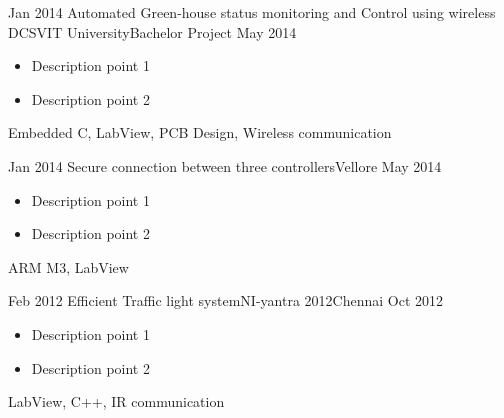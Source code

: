 \begin{experiences}
	\experience
	{Jan 2014}   {Automated Green-house status monitoring and Control using wireless DCS}{VIT University}{Bachelor Project}
	{May 2014} {
	  	\begin{itemize}
	  		\item Description point 1
	  		\item Description point 2
	  	\end{itemize}
	}
	{Embedded C, LabView, PCB Design, Wireless communication }
	\emptySeparator

	\experience
	{Jan 2014}   {Secure connection between three controllers}{}{Vellore}
	{May 2014} {
		\begin{itemize}
			\item Description point 1
			\item Description point 2
		\end{itemize}
	}
	{ARM M3, LabView }
	\emptySeparator
	
	\experience
	{Feb 2012}   {Efficient Traffic light system}{NI-yantra 2012}{Chennai}
	{Oct 2012} {
		\begin{itemize}
			\item Description point 1
			\item Description point 2
		\end{itemize}
	}
	{LabView, C++, IR communication }
	\emptySeparator

	
		
\end{experiences}
